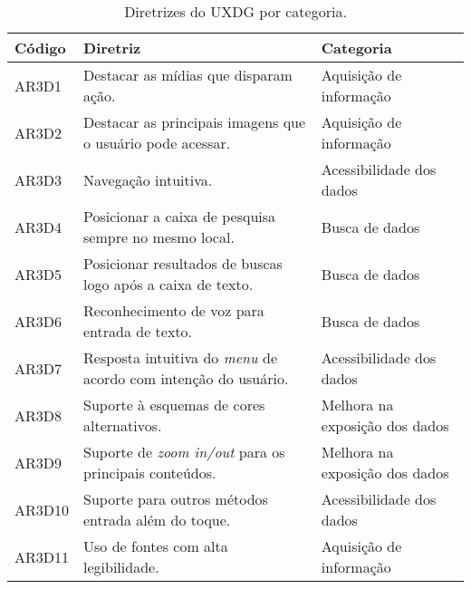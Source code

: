 \begin{table}[htb]
  \begin{center}
    \ABNTEXfontereduzida
    \caption{Diretrizes do UXDG por categoria.}
    \label{tab-acc-dir-uxd-1}
    \begin{tabular}{p{1.2cm}|p{8.8cm}|p{4.5cm}}
      \textbf{Código} & \textbf{Diretriz}                                                    & \textbf{Categoria}             \\
      \hline
      AR3D1           & Destacar as mídias que disparam ação.                                & Aquisição de informação        \\
      \hline
      AR3D2           & Destacar as principais imagens que o usuário pode acessar.           & Aquisição de informação        \\
      \hline
      AR3D3           & Navegação intuitiva.                                                 & Acessibilidade dos dados       \\
      \hline
      AR3D4           & Posicionar a caixa de pesquisa sempre no mesmo local.                & Busca de dados                 \\
      \hline
      AR3D5           & Posicionar resultados de buscas logo após a caixa de texto.          & Busca de dados                 \\
      \hline
      AR3D6           & Reconhecimento de voz para entrada de texto.                         & Busca de dados                 \\
      \hline
      AR3D7           & Resposta intuitiva do \emph{menu} de acordo com intenção do usuário. & Acessibilidade dos dados       \\
      \hline
      AR3D8           & Suporte à esquemas de cores alternativos.                            & Melhora na exposição dos dados \\
      \hline
      AR3D9           & Suporte de \emph{zoom in/out} para os principais conteúdos.          & Melhora na exposição dos dados \\
      \hline
      AR3D10          & Suporte para outros métodos entrada além do toque.                   & Acessibilidade dos dados       \\
      \hline
      AR3D11          & Uso de fontes com alta legibilidade.                                 & Aquisição de informação        \\
    \end{tabular}
  \end{center}
\end{table}

